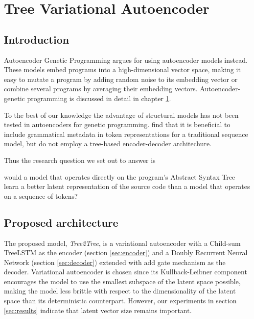 \chapter{Tree Variational Autoencoder}\label{ch:tree2tree}


\section{Introduction}

Autoencoder Genetic Programming \cite{autoenc-gp,wittenbergDenoisingAutoencoderGenetic2023,latentspaceopt} argues for using autoencoder \cite{autoencoders} models instead.
These models embed programs into a high-dimensional vector space, making it easy to mutate a program by adding random noise to its embedding vector or combine several programs by averaging their embedding vectors.
Autoencoder-genetic programming is discussed in detail in chapter \ref{ch:tree2tree}.

To the best of our knowledge the advantage of structural models has not been tested in autoencoders for genetic programming. \cite{kusner2017grammar,grammar-vae} find that it is beneficial to include grammatical metadata in token representations for a traditional sequence model, but do not employ a tree-based encoder-decoder architechure.

Thus the research question  we set out to answer is

\begin{highlight}
    would a model that operates directly on the program's Abstract Syntax Tree learn a better latent representation of the source code than a model that operates on a sequence of tokens?
\end{highlight}

\newpage
\section{Proposed architecture}

The proposed model, \emph{Tree2Tree}, is a variational autoencoder with a Child-sum TreeLSTM as the encoder (section \ref{sec:encoder}) and a Doubly Recurrent Neural Network (section \ref{sec:decoder}) extended with add gate mechanism as the decoder.
Variational autoencoder \cite{kingma2013auto} is chosen since its Kullback-Leibner component encourages the model to use the smallest subspace of the latent space possible, making the model less brittle with respect to the dimensionality of the latent space than its deterministic counterpart.
However, our experiments in section \ref{sec:results} indicate that latent vector size remains important.

